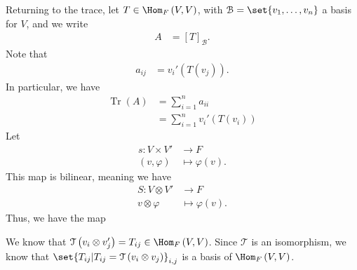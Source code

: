 \documentclass[10pt]{mypackage}
\begin{document}
  Returning to the trace, let $T\in \Hom_{F}\left(V,V\right)$, with $\mathcal{B} = \set{v_1,\dots,v_n}$ a basis for $V$, and we write
  \begin{align*}
    A &= \left[T\right]_{\mathcal{B}}.
  \end{align*}
  Note that
  \begin{align*}
    a_{ij} &= v_{i}'\left(T\left(v_j\right)\right).
  \end{align*}
  In particular, we have
  \begin{align*}
    \operatorname{Tr}\left(A\right) &= \sum_{i=1}^{n}a_{ii}\\
                      &= \sum_{i=1}^{n}v_i'\left(T\left(v_i\right)\right)
  \end{align*}
  Let
  \begin{align*}
    s: V\times V' &\rightarrow F\\
    \left(v,\varphi\right) &\mapsto \varphi(v).
  \end{align*}
  This map is bilinear, meaning we have
  \begin{align*}
    S: V\otimes V' &\rightarrow F\\
    v\otimes \varphi &\mapsto \varphi(v).
  \end{align*}
  Thus, we have the map
  \begin{center}
  \end{center}
  We know that $\mathcal{T}\left(v_{i}\otimes v_{j}'\right) = T_{ij}\in \Hom_{F}\left(V,V\right)$. Since $\mathcal{T}$ is an isomorphism, we know that $\set{T_{ij} | T_{ij} = \mathcal{T}\left(v_{i}\otimes v_j\right)}_{i,j}$ is a basis of $\Hom_{F}\left(V,V\right)$.\newline
\end{document}

